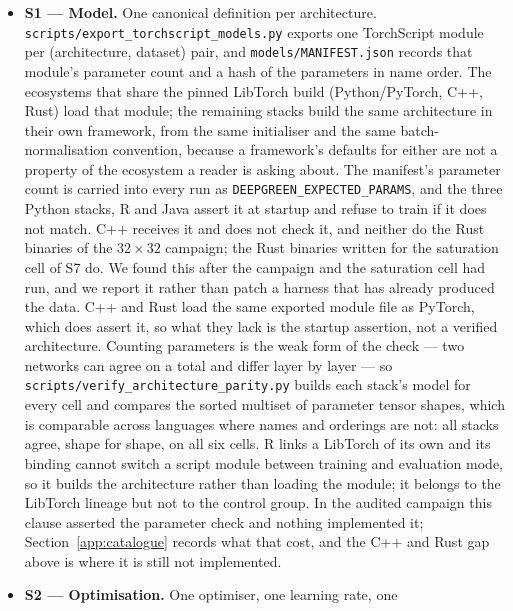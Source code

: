 \begin{itemize}\itemsep2pt
  \item \textbf{S1 --- Model.} One canonical definition per architecture.
        \texttt{scripts/export\_torchscript\_models.py} exports one TorchScript
        module per (architecture, dataset) pair, and
        \texttt{models/MANIFEST.json} records that module's parameter count and
        a hash of the parameters in name order. The \vCtrlStacks{} ecosystems that share the
        pinned LibTorch build (Python/PyTorch, C++, Rust) load that module; the
        remaining stacks build the same architecture in their own framework,
        from the same initialiser and the same batch-normalisation convention,
        because a framework's defaults for either are not a property of the
        ecosystem a reader is asking about. The manifest's parameter count is
        carried into every run as \texttt{DEEPGREEN\_EXPECTED\_PARAMS}, and the
        three Python stacks, R and Java assert it at startup and refuse to train
        if it does not match. C++ receives it and does not check it, and neither
        do the Rust binaries of the $32\times32$ campaign; the Rust binaries
        written for the saturation cell of S7 do. We found this after the campaign and the
        saturation cell had run, and we report it rather than patch a harness that has
        already produced the data. C++ and Rust load the same exported module
        file as PyTorch, which does assert it, so what they lack is the startup
        assertion, not a verified architecture. Counting parameters is the weak form of the check --- two
        networks can agree on a total and differ layer by layer --- so
        \texttt{scripts/verify\_architecture\_parity.py} builds each stack's
        model for every cell and compares the sorted multiset of parameter
        tensor shapes, which is comparable across languages where names and
        orderings are not: all \vEcosystems{} stacks agree, shape for shape, on
        all six cells. R links a LibTorch of its own and its binding cannot
        switch a script module between training and evaluation mode, so it
        builds the architecture rather than loading the module; it belongs to
        the LibTorch lineage but not to the control group. In the audited
        campaign this clause asserted the parameter check and nothing
        implemented it;
        Section~\ref{app:catalogue} records what that cost, and the C++ and
        Rust gap above is where it is still not implemented.
  \item \textbf{S2 --- Optimisation.} One optimiser, one learning rate, one

\end{itemize}
